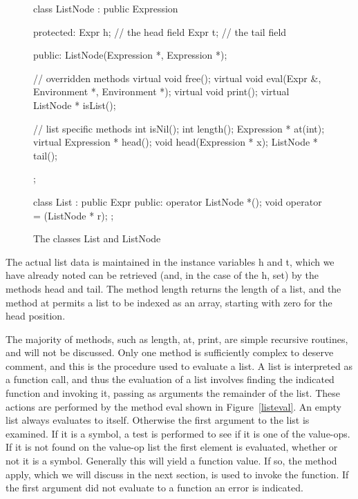 \begin{figure}
\begin{cprog}
class ListNode : public Expression {
protected:
	Expr h;		// the head field
	Expr t;		// the tail field

public:
	ListNode(Expression *, Expression *);

	// overridden methods
	virtual void free();
	virtual void eval(Expr &, Environment *, Environment *);
	virtual void print();
	virtual ListNode * isList();

	// list specific methods
	int isNil();
	int length();
	Expression * at(int);
	virtual Expression * head();
	void head(Expression * x);
	ListNode * tail();
};


class List : public Expr {
public:
	operator ListNode *();
	void operator = (ListNode * r);
};
\end{cprog}
\caption{The classes {\sf List} and {\sf ListNode}}\label{list}
\end{figure}

The actual list data is maintained in the instance variables {\sf h} and
{\sf t}, which we have already noted can be retrieved (and, in the case of
the h, set) by the methods {\sf head} and {\sf tail}.  The method {\sf
length} returns the length of a list, and the method {\sf at} permits a
list to be indexed as an array, starting with zero for the head position.

The majority of methods, such as {\sf length}, {\sf at}, {\sf print},
are simple recursive routines, and will not be discussed.  Only one method
is sufficiently complex to deserve comment, and this is the procedure used to
evaluate a list.  A list is interpreted as a function call, and thus 
the evaluation of a list involves finding the indicated function and
invoking it, passing as arguments the remainder of the list.  These actions
are performed by the method {\sf eval} shown in Figure~\ref{listeval}.
An empty list always evaluates to itself.  Otherwise the first argument to
the list is examined.  If it is a symbol, a test is performed to see if it
is one of the value-ops.  If it is not found on the value-op list the first
element is evaluated, whether or not it is a symbol.  Generally this will
yield a function value.  If so, the method {\sf apply}, which we will
discuss in the next section, is used to invoke the function.
If the first argument did not evaluate to a function an error is indicated.

